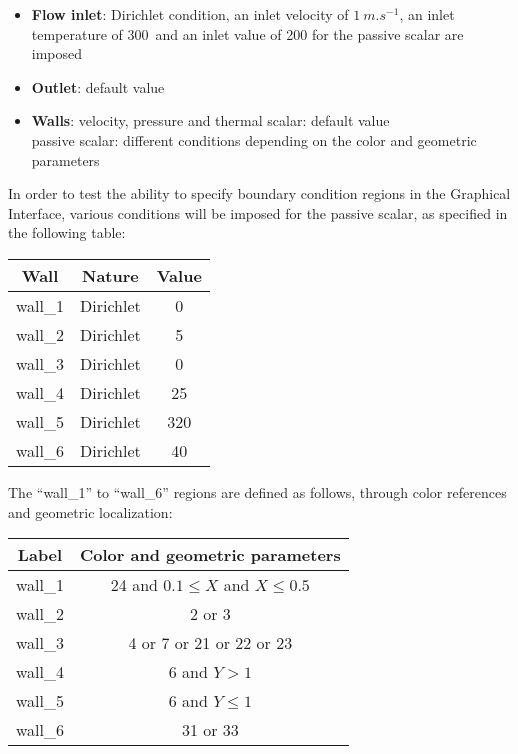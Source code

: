 \begin{itemize}
	\item {\bfseries Flow inlet}: Dirichlet condition, an inlet velocity of
$1\ m.s^{-1}$, an inlet temperature of 300\degresC\ and an inlet value of 200
for the passive scalar are imposed
	\item {\bfseries Outlet}: default value
	\item {\bfseries Walls}: velocity, pressure and thermal scalar: default value \\
	            \hspace*{1.25cm} passive scalar: different conditions
depending on the color and geometric parameters
\end{itemize}

In order to test the ability to specify boundary condition regions in the
Graphical Interface, various conditions will be imposed for the passive scalar,
as specified in the following table:

\begin{center}
\begin{tabular}{|c|c|c|}
\hline
Wall & Nature & Value \\
\hline 
wall\_1 & Dirichlet  & 0 \\ 
\hline 
wall\_2 & Dirichlet  & 5 \\ 
\hline 
wall\_3 & Dirichlet  & 0 \\ 
\hline 
wall\_4 & Dirichlet  & 25 \\ 
\hline 
wall\_5 & Dirichlet  & 320 \\ 
\hline 
wall\_6 & Dirichlet  & 40 \\ 
\hline
\end{tabular} 
\end{center}

The ``wall\_1'' to ``wall\_6'' regions are defined as follows, through color
references and geometric localization:
\begin{center}
\begin{tabular}{c|c}
Label & Color and geometric parameters \\
\hline
wall\_1 & 24 and $0.1\leqslant X$ and $X\leqslant 0.5$ \\
wall\_2 & 2 or 3 \\
wall\_3 & 4 or 7 or 21 or 22 or 23 \\
wall\_4 & 6 and $Y>1$ \\
wall\_5 & 6 and $Y\leqslant1$ \\
wall\_6 & 31 or 33 \\
\end{tabular}
\end{center}

